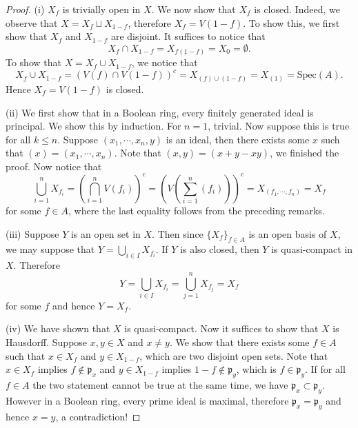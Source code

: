 \begin{proof}
(i) $X_f$ is trivially open in $X$. We now show that $X_f$ is closed. Indeed, we observe that $X=X_f\sqcup X_{1-f}$, therefore $X_f=V(1-f)$. To show this, we first show that $X_f$ and $X_{1-f}$ are disjoint. It suffices to notice that 
$$
X_f\cap X_{1-f}=X_{f\left( 1-f \right)}=X_0=\emptyset .
$$
To show that $X=X_f\cup X_{1-f}$, we notice that 
$$
X_f\cup X_{1-f}=\left( V\left( f \right) \cap V\left( 1-f \right) \right) ^c=X_{\left( f \right) \cup \left( 1-f \right)}=X_{\left( 1 \right)}=\mathrm{Spec}\left( A \right) .
$$
Hence $X_f=V(1-f)$ is closed.\par
(ii) We first show that in a Boolean ring, every finitely generated ideal is principal. We show this by induction. For $n=1$, trivial. Now suppose this is true for all $k\le n$. Suppose $(x_1,\cdots,x_n,y)$ is an ideal, then there exists some $x$ such that $(x)=(x_1,\cdots,x_n)$. Note that $(x,y)=(x+y-xy)$, we finished the proof. Now notice that 
$$
\bigcup_{i=1}^n{X_{f_i}}=\left( \bigcap_{i=1}^n{V\left( f_i \right)} \right) ^c=\left( V\left( \sum_{i=1}^n{\left( f_i \right)} \right) \right) ^c=X_{\left( f_1,\cdots ,f_n \right)}=X_f
$$
for some $f\in A$, where the last equality follows from the preceding remarks.\par
(iii) Suppose $Y$ is an open set in $X$. Then since $\{X_f\}_{f\in A}$ is an open basis of $X$, we may suppose that $Y=\bigcup_{i\in I}X_{f_i}$. If $Y$ is also closed, then $Y$ is quasi-compact in $X$. Therefore 
$$
Y=\bigcup_{i\in I}{X_{f_i}}=\bigcup_{j=1}^n{X_{f_j}}=X_f
$$
for some $f$ and hence $Y=X_f$.\par
(iv) We have shown that $X$ is quasi-compact. Now it suffices to show that $X$ is Hausdorff. Suppose $x,y\in X$ and $x\ne y$. We show that there exists some $f\in A$ such that $x\in X_f$ and $y\in X_{1-f}$, which are two disjoint open sets. Note that $x\in X_f$ implies $f\notin\mathfrak{p}_x$ and $y\in X_{1-f}$ implies $1-f\notin\mathfrak{p}_y$, which is $f\in\mathfrak{p}_y$. If for all $f\in A$ the two statement cannot be true at the same time, we have $\mathfrak{p}_x\subset\mathfrak{p}_y$. However in a Boolean ring, every prime ideal is maximal, therefore $\mathfrak{p}_x=\mathfrak{p}_y$ and hence $x=y$, a contradiction!
\end{proof}
